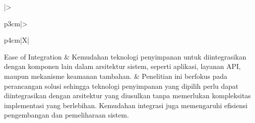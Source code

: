 \begin{xltabular}{\textwidth}{|>{\raggedright\arraybackslash}p{3cm}|>{\raggedright\arraybackslash}p{4cm}|X|}
    Ease of Integration &
    Kemudahan teknologi penyimpanan untuk diintegrasikan dengan komponen lain dalam arsitektur sistem, seperti aplikasi, layanan API, maupun mekanisme keamanan tambahan. &
    Penelitian ini berfokus pada perancangan solusi sehingga teknologi penyimpanan yang dipilih perlu dapat diintegrasikan dengan arsitektur yang diusulkan tanpa memerlukan kompleksitas implementasi yang berlebihan. Kemudahan integrasi juga memengaruhi efisiensi pengembangan dan pemeliharaan sistem. \\
    \hline

\end{xltabular}